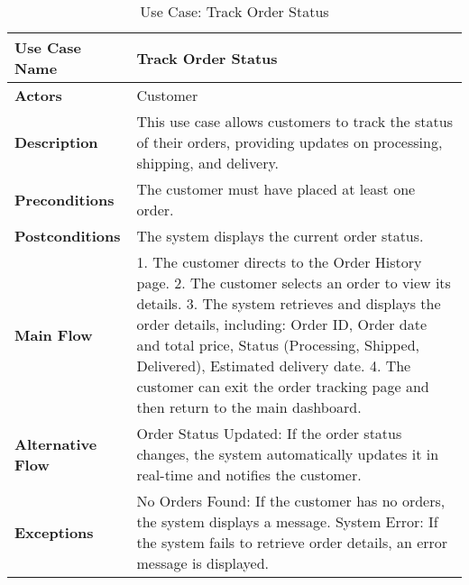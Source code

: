 \begin{table}[h]
\centering
\begin{tabular}{|p{3cm}|p{10cm}|}
\hline
\textbf{Use Case Name} & Track Order Status \\
\hline
\textbf{Actors} & Customer \\
\hline
\textbf{Description} & This use case allows customers to track the status of their orders, providing updates on processing, shipping, and delivery. \\
\hline
\textbf{Preconditions} & The customer must have placed at least one order. \\
\hline
\textbf{Postconditions} & The system displays the current order status. \\
\hline
\textbf{Main Flow} & 1. The customer directs to the Order History page. 2. The customer selects an order to view its details. 3. The system retrieves and displays the order details, including: Order ID, Order date and total price, Status (Processing, Shipped, Delivered), Estimated delivery date. 4. The customer can exit the order tracking page and then return to the main dashboard. \\
\hline
\textbf{Alternative Flow} & Order Status Updated: If the order status changes, the system automatically updates it in real-time and notifies the customer. \\
\hline
\textbf{Exceptions} & No Orders Found: If the customer has no orders, the system displays a message. System Error: If the system fails to retrieve order details, an error message is displayed. \\
\hline
\end{tabular}
\caption{Use Case: Track Order Status}
\end{table}

